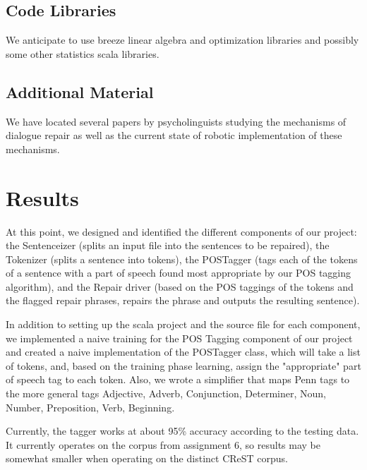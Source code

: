 \documentclass{article}
\begin{document}
\subsection{Code Libraries}

\begin{flushleft}
We anticipate to use breeze linear algebra and optimization libraries and possibly some other statistics scala libraries.
\end{flushleft}

\subsection{Additional Material}

We have located several papers by psycholinguists studying the mechanisms of dialogue repair as well as the current state of robotic implementation of these mechanisms.

\section{Results}

\begin {flushleft}

At this point, we designed and identified the different components of our project: the Sentenceizer (splits an input file into the sentences to be repaired), the Tokenizer (splits a sentence into tokens), the POSTagger (tags each of the tokens of a sentence with a part of speech found most appropriate by our POS tagging algorithm), and the Repair driver (based on the POS taggings of the tokens and the flagged repair phrases, repairs the phrase and outputs the resulting sentence).

\end {flushleft}

\begin {flushleft}

 In addition to setting up the scala project and the source file for each component, we implemented a naive training for the POS Tagging component of our project and created a naive implementation of the POSTagger class, which will take a list of tokens, and, based on the training phase learning, assign the "appropriate" part of speech tag to each token. Also, we wrote a simplifier that maps Penn tags to the more general tags {Adjective, Adverb, Conjunction, Determiner, Noun, Number, Preposition, Verb, Beginning}.

 Currently, the tagger works at about 95\% accuracy according to the testing data. It currently operates on the corpus from assignment 6, so results may be somewhat smaller when operating on the distinct CReST corpus.
 
 \end{flushleft}
\end{document}
